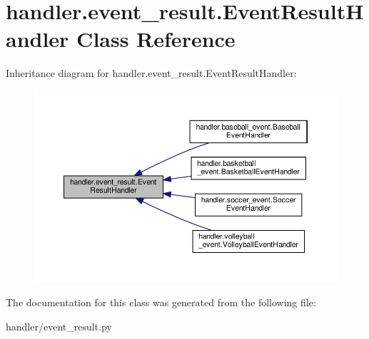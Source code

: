 \hypertarget{classhandler_1_1event__result_1_1_event_result_handler}{}\section{handler.\+event\+\_\+result.\+Event\+Result\+Handler Class Reference}
\label{classhandler_1_1event__result_1_1_event_result_handler}


Inheritance diagram for handler.\+event\+\_\+result.\+Event\+Result\+Handler\+:
\nopagebreak
\begin{figure}[H]
\begin{center}
\leavevmode
\includegraphics[width=350pt]{classhandler_1_1event__result_1_1_event_result_handler__inherit__graph}
\end{center}
\end{figure}


The documentation for this class was generated from the following file\+:\begin{DoxyCompactItemize}
\item 
handler/event\+\_\+result.\+py\end{DoxyCompactItemize}
